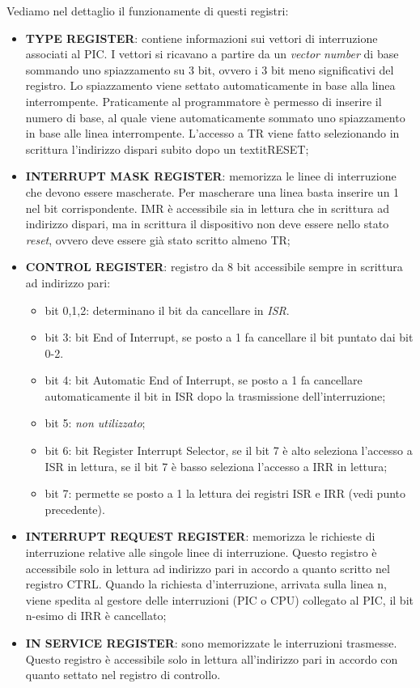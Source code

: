Vediamo nel dettaglio il funzionamente di questi registri:
\begin{itemize}
    \item \textbf{TYPE REGISTER}: contiene informazioni sui vettori di interruzione associati al PIC. I vettori si ricavano a partire da un \textit{vector number} di base sommando uno spiazzamento su 3 bit, ovvero i 3 bit meno significativi del registro. Lo spiazzamento viene settato automaticamente in base alla linea interrompente. Praticamente al programmatore è permesso di inserire il numero di base, al quale viene automaticamente sommato uno spiazzamento in base alle linea interrompente.  L’accesso a TR viene fatto selezionando in scrittura  l’indirizzo dispari subito dopo un textit{RESET};
    \item \textbf{INTERRUPT MASK REGISTER}: memorizza le linee di interruzione che devono essere mascherate. Per mascherare una linea basta inserire un 1 nel bit corrispondente. IMR è accessibile sia in lettura che in scrittura ad indirizzo dispari, ma in scrittura il dispositivo non deve essere nello stato \textit{reset}, ovvero deve essere già stato scritto almeno TR;
    \item \textbf{CONTROL REGISTER}: registro da 8 bit accessibile sempre in scrittura ad indirizzo pari:
    \begin{itemize}
        \item bit 0,1,2: determinano il bit da cancellare in \textit{ISR}.
        \item bit 3: bit End of Interrupt, se posto a 1 fa cancellare il bit puntato dai bit 0-2. 
        \item bit 4: bit Automatic End of Interrupt, se posto a 1 fa cancellare automaticamente il bit in ISR dopo la trasmissione dell'interruzione;
        \item bit 5: \textit{non utilizzato};
        \item bit 6: bit Register Interrupt Selector, se il bit 7 è alto seleziona l'accesso a ISR in lettura, se il bit 7 è basso seleziona l'accesso a IRR in lettura;
        \item bit 7: permette se posto a 1 la lettura dei registri ISR e IRR (vedi punto precedente).
    \end{itemize}
    \item \textbf{INTERRUPT REQUEST REGISTER}: memorizza le richieste di interruzione relative alle singole linee di interruzione. Questo registro è accessibile solo in lettura ad indirizzo pari in accordo a quanto scritto nel registro CTRL. 
    Quando la richiesta d'interruzione, arrivata sulla linea n, viene spedita al gestore delle interruzioni (PIC o CPU) collegato al PIC, il bit n-esimo di IRR è cancellato;
    \item \textbf{IN SERVICE REGISTER}: sono memorizzate le interruzioni trasmesse.  Questo registro è accessibile solo in lettura all'indirizzo pari in accordo con quanto settato nel registro di controllo. 
\end{itemize}

